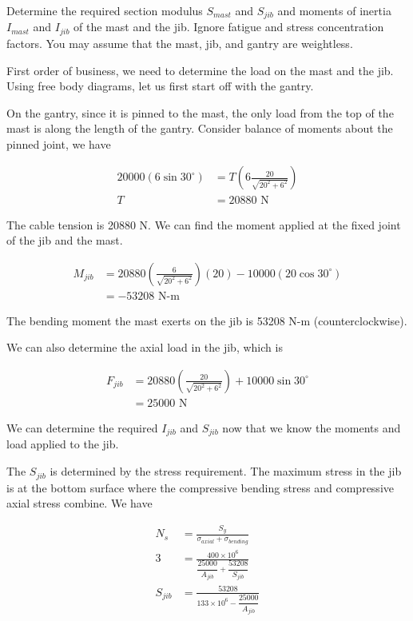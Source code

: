 \documentclass[a4paper,openany,12pt]{book}
\begin{document}
{{\begin{enumerate}
Determine the required section modulus \(S_{mast}\) and \(S_{jib}\) and
moments of inertia \(I_{mast}\) and \(I_{jib}\) of the mast and the jib.
Ignore fatigue and stress concentration factors. You may assume that the
mast, jib, and gantry are weightless.

First order of business, we need to determine the load on the mast and
the jib. Using free body diagrams, let us first start off with the
gantry.

On the gantry, since it is pinned to the mast, the only load from the
top of the mast is along the length of the gantry. Consider balance of
moments about the pinned joint, we have

$$\begin{aligned}
    20000(6 \sin 30^{\circ}) &= T \left( 6 \frac{20}{\sqrt{ 20^2 +6^2 }} \right) \\
    T &= 20880 \text{ N}
  \end{aligned}$$

The cable tension is 20880 N. We can find the moment applied at the
fixed joint of the jib and the mast.

$$\begin{aligned}
    M_{jib} &= 20880 \left( \frac{6}{\sqrt{20^2 + 6^2}} \right) (20) - 10000(20 \cos 30^{\circ}) \\
            &= -53208 \text{ N-m}
  \end{aligned}$$

The bending moment the mast exerts on the jib is 53208 N-m
(counterclockwise).

We can also determine the axial load in the jib, which is

$$\begin{aligned}
    F_{jib} &= 20880 \left( \frac{20}{\sqrt{20^2 + 6^2}} \right) + 10000 \sin 30^{\circ} \\
            &= 25000 \text{ N}
  \end{aligned}$$

We can determine the required \(I_{jib}\) and \(S_{jib}\) now that we know
the moments and load applied to the jib.

The \(S_{jib}\) is determined by the stress requirement. The maximum
stress in the jib is at the bottom surface where the compressive bending
stress and compressive axial stress combine. We have

$$\begin{aligned}
    N_s &= \frac{S_y}{\sigma_{axial} + \sigma_{bending}} \\
    3 &= \frac{400 \times 10^6}{\dfrac{25000}{A_{jib}} + \dfrac{53208}{S_{jib}}} \\[1ex]
    S_{jib} &= \frac{53208}{133 \times 10^6 - \dfrac{25000}{A_{jib}}}
  \end{aligned}$$


\end{enumerate}}}
\end{document}
